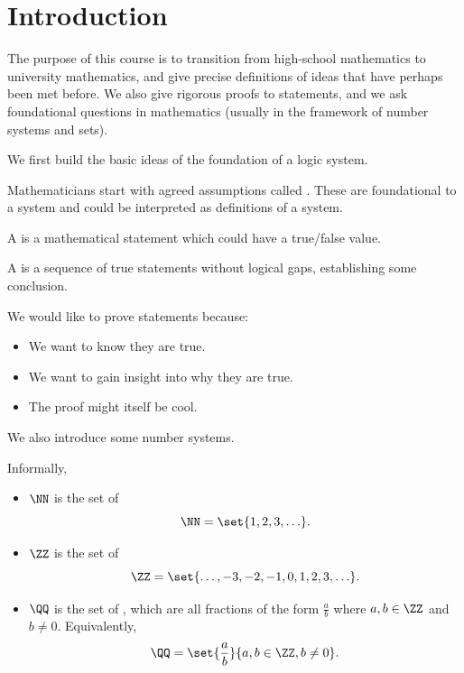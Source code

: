 \section{Introduction}
\label{sec:introduction}

The purpose of this course is to transition from high-school mathematics to university mathematics, and give precise definitions of ideas that have perhaps been met before. We also give rigorous proofs to statements, and we ask foundational questions in mathematics (usually in the framework of number systems and sets).


We first build the basic ideas of the foundation of a logic system.

\begin{definition}
    Mathematicians start with agreed assumptions called . These are foundational to a system and could be interpreted as definitions of a system.

    A  is a mathematical statement which could have a true/false value.

    A  is a sequence of true statements without logical gaps, establishing some conclusion.
\end{definition}

We would like to prove statements because:
\begin{itemize}
    \item We want to know they are true.
    \item We want to gain insight into why they are true.
    \item The proof might itself be cool.
\end{itemize}

We also introduce some number systems.

\begin{definition}[\(\NN\), \(\ZZ\), \(\QQ\) (Informally)]
    Informally,
    \begin{itemize}
        \item \(\NN\) is the set of 
        \[
            \NN = \set{1, 2, 3, \ldots}.
        \]
        \item \(\ZZ\) is the set of 
        \[
            \ZZ = \set{\ldots, -3, -2, -1, 0, 1, 2, 3, \ldots}.
        \]
        \item \(\QQ\) is the set of , which are all fractions of the form \(\frac{a}{b}\) where \(a, b \in \ZZ\) and \(b \neq 0\). Equivalently,
        \[
            \QQ = \set{\frac{a}{b}}{a, b \in \ZZ, b \neq 0}.
        \]
    \end{itemize}
\end{definition}


